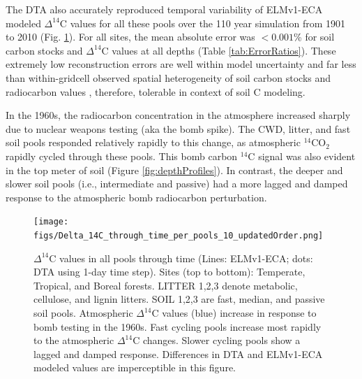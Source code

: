 \documentclass[11pt,a4paper]{article}
\begin{document}
 The DTA also accurately reproduced temporal variability of ELMv1-ECA modeled $\Delta^{14}$C values for all these pools over the 110 year simulation from 1901 to 2010 (Fig. \ref{fig:poolsOverTime}). For all sites, the mean absolute error was $<0.001$\% for soil carbon stocks and $\Delta^{14}$C values at all depths (Table \ref{tab:ErrorRatios}). These extremely low reconstruction errors are well within model uncertainty and far less than within-gridcell observed spatial heterogeneity of soil carbon stocks and radiocarbon values \citep{Chen2009JGR}, therefore, tolerable in context of soil C modeling.

In the 1960s, the radiocarbon concentration in the atmosphere increased sharply due to nuclear weapons testing (aka the bomb spike). The CWD, litter, and fast soil pools responded relatively rapidly to this change, as atmospheric $^{14}$CO$_2$ rapidly cycled through these pools. This bomb carbon $^{14}$C signal was also evident in the top meter of soil (Figure \ref{fig:depthProfiles}). In contrast, the deeper and slower soil pools (i.e., intermediate and passive) had a more lagged and damped response to the atmospheric bomb radiocarbon perturbation.

\begin{figure}[htbp]
        \centering 
        \vspace{-8em}
        \texttt{[image: figs/Delta\_14C\_through\_time\_per\_pools\_10\_updatedOrder.png]}
        \vspace{-4em}
        \caption{$\Delta^{14}$C values in all pools through time (Lines: ELMv1-ECA; dots: DTA using 1-day time step). Sites (top to bottom): Temperate, Tropical, and Boreal forests. LITTER 1,2,3 denote metabolic, cellulose, and lignin litters. SOIL 1,2,3 are fast, median, and passive soil pools. Atmospheric $\Delta^{14}$C values (blue) increase in response to bomb testing in the 1960s. Fast cycling pools increase most rapidly to the atmospheric $\Delta^{14}$C changes. Slower cycling pools show a lagged and damped response. Differences in DTA and ELMv1-ECA modeled values are imperceptible in this figure.
        \label{fig:poolsOverTime}
        }
    \end{figure}    
    
    
\end{document}
